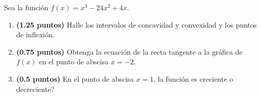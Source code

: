 
Sea la función $f(x)=x^3-24x^2+4x$.
\begin{enumerate}[label=\alph*)]
\item \textbf{(1.25 puntos)} Halle los intervalos de concavidad y convexidad y los puntos de inflexión.
\item \textbf{(0.75 puntos)} Obtenga la ecuación de la recta tangente a la gráfica de $f(x)$ en el punto de abscisa $x=-2$.
\item \textbf{(0.5 puntos)} En el punto de abscisa $x=1$, \textquestiondown{}la función es creciente o decreciente?
\end{enumerate}
